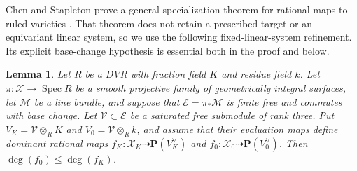 \documentclass[12pt]{amsart}
\numberwithin{equation}{section}
\newtheorem{lemma}[theorem]{Lemma}
\theoremstyle{definition}
\theoremstyle{remark}
\newcommand{\PP}{\mathbf P}
\newcommand{\Spec}{\operatorname{Spec}}
\begin{document}
Chen and Stapleton prove a general specialization theorem for rational
maps to ruled varieties \cite[Theorem~1.1]{ChenStapleton}.  That theorem
does not retain a prescribed target or an equivariant linear system, so
we use the following fixed-linear-system refinement.  Its explicit
base-change hypothesis is essential both in the proof and below.

\begin{lemma}\label{lem:degree-specialization}
Let $R$ be a DVR with fraction field $K$ and residue field $k$.  Let
$\pi:\mathscr X\to\Spec R$ be a smooth projective family of geometrically
integral surfaces, let $\mathscr M$ be a line bundle, and suppose that
$\mathscr E=\pi_*\mathscr M$ is finite free and commutes with base change.
Let $\mathscr V\subset\mathscr E$ be a saturated free submodule of rank
three.  Put $V_K=\mathscr V\otimes_RK$ and
$V_0=\mathscr V\otimes_Rk$, and assume that their evaluation maps define
dominant rational maps $f_K:\mathscr X_K\dashrightarrow\PP(V_K^\vee)$
and $f_0:\mathscr X_0\dashrightarrow\PP(V_0^\vee)$.  Then
$\deg(f_0)\leq\deg(f_K)$.
\end{lemma}
\end{document}
